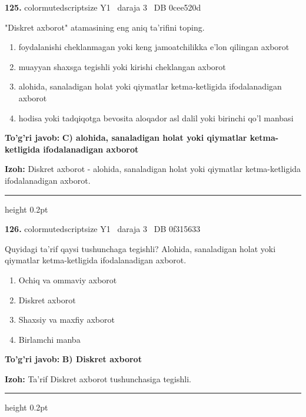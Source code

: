 \documentclass[10pt,a4paper,oneside]{article}
\begin{document}
\noindent\textbf{\color{ink}125.}  {color{muted}scriptsize Y1 \textbullet\ daraja 3 \textbullet\ DB 0cee520d}
\par
"Diskret axborot" atamasining eng aniq ta'rifini toping.
\begin{enumerate}[label=\Alph*),leftmargin=9mm]
\item foydalanishi cheklanmagan yoki keng jamoatchilikka e'lon qilingan axborot
\item muayyan shaxsga tegishli yoki kirishi cheklangan axborot
\item alohida, sanaladigan holat yoki qiymatlar ketma-ketligida ifodalanadigan axborot
\item hodisa yoki tadqiqotga bevosita aloqador asl dalil yoki birinchi qo'l manbasi
\end{enumerate}
\begin{tcolorbox}[enhanced,breakable,colback=teal!4,colframe=teal!50!black,boxrule=0.5pt,arc=1.1mm,left=3mm,right=3mm,top=1.7mm,bottom=1.7mm,before skip=2mm,after skip=2mm]
\textbf{\color{teal}To'g'ri javob:} \textbf{C) alohida, sanaladigan holat yoki qiymatlar ketma-ketligida ifodalanadigan axborot}
\par\smallskip
\textbf{Izoh:} Diskret axborot - alohida, sanaladigan holat yoki qiymatlar ketma-ketligida ifodalanadigan axborot.
\end{tcolorbox}
\vspace{2mm}\hrule height 0.2pt \vspace{3mm}

\noindent\textbf{\color{ink}126.}  {color{muted}scriptsize Y1 \textbullet\ daraja 3 \textbullet\ DB 0f315633}
\par
Quyidagi ta'rif qaysi tushunchaga tegishli? Alohida, sanaladigan holat yoki qiymatlar ketma-ketligida ifodalanadigan axborot.
\begin{enumerate}[label=\Alph*),leftmargin=9mm]
\item Ochiq va ommaviy axborot
\item Diskret axborot
\item Shaxsiy va maxfiy axborot
\item Birlamchi manba
\end{enumerate}
\begin{tcolorbox}[enhanced,breakable,colback=teal!4,colframe=teal!50!black,boxrule=0.5pt,arc=1.1mm,left=3mm,right=3mm,top=1.7mm,bottom=1.7mm,before skip=2mm,after skip=2mm]
\textbf{\color{teal}To'g'ri javob:} \textbf{B) Diskret axborot}
\par\smallskip
\textbf{Izoh:} Ta'rif Diskret axborot tushunchasiga tegishli.
\end{tcolorbox}
\vspace{2mm}\hrule height 0.2pt \vspace{3mm}
\end{document}
